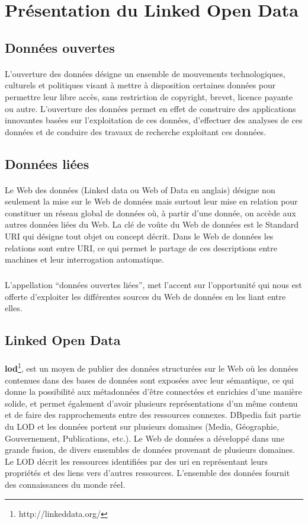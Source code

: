 \section{Présentation du Linked Open Data}
\subsection{Données ouvertes}
\paragraph{}
 L'ouverture des données désigne un ensemble de mouvements technologiques, culturels et politiques visant à mettre à disposition certaines données pour permettre leur libre accès, sans restriction de copyright, brevet, licence payante ou autre.
L'ouverture des données permet en effet de construire des applications innovantes basées sur l'exploitation de ces données, d'effectuer des analyses de ces données et de conduire des travaux de recherche exploitant ces données.
\subsection{Données liées}
\paragraph{}
Le Web des données (Linked data ou Web of Data en anglais) désigne non seulement la mise sur le Web de données mais surtout leur mise en relation pour constituer un réseau global de données où, à partir d'une donnée, on accède aux autres données liées du Web. La clé de voûte du Web de données est le Standard URI qui désigne tout objet ou concept décrit. Dans le Web de données les relations sont entre URI, ce qui permet le partage de ces descriptions entre machines et leur interrogation automatique.
\subparagraph{}
L'appellation ``données ouvertes liées'', met l'accent sur l'opportunité qui nous est offerte d'exploiter les différentes sources du Web de données en les liant entre elles. 
\subsection{Linked Open Data}
\paragraph{}
{\bf\gls{lod}}\footnote{http://linkeddata.org/}, est un moyen de publier des données structurées sur le Web où les données contenues dans des bases de données sont exposées avec leur sémantique, ce qui donne la possibilité aux métadonnées d'être connectées et enrichies d'une manière solide, et permet également d'avoir plusieurs représentations d'un même contenu et de faire des rapprochements entre des ressources connexes. DBpedia fait partie du LOD et les données portent sur plusieurs domaines (Media, Géographie, Gouvernement, Publications, etc.).
Le Web de données a développé dans une grande fusion, de divers ensembles de données provenant de plusieurs domaines. Le LOD décrit les ressources identifiées par des \gls{uri} en représentant leurs propriétés et des liens vers d’autres ressources. L'ensemble des données fournit des connaissances du monde réel.
